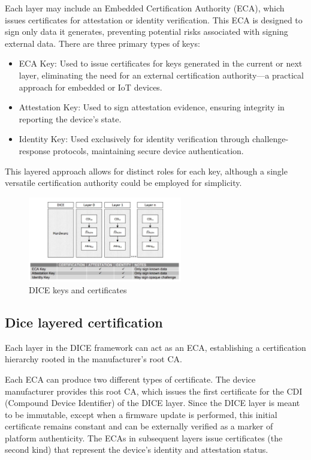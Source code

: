 Each layer may include an Embedded Certification Authority (ECA),
which issues certificates for attestation or identity verification.
This ECA is designed to sign only data it generates, preventing
potential risks associated with signing external data. There are three
primary types of keys:

\begin{itemize}
  \item ECA Key: Used to issue certificates for keys generated in the
    current or next layer, eliminating the need for an external
    certification authority—a practical approach for embedded or IoT
    devices.
  \item Attestation Key: Used to sign attestation evidence, ensuring
    integrity in reporting the device's state.
  \item Identity Key: Used exclusively for identity verification
    through challenge-response protocols, maintaining secure device
    authentication.
\end{itemize}

This layered approach allows for distinct roles for each key, although
a single versatile certification authority could be employed for
simplicity.

\begin{figure}[H]
  \centering
  \includegraphics[width=0.6\textwidth]{img/dice keycert.png}
  \caption{DICE keys and certificates}
\end{figure}

\subsection{Dice layered certification}
\begin{boxH}
  Each layer in the DICE framework can act as an ECA, establishing a
  certification hierarchy rooted in the manufacturer’s root CA. 
\end{boxH}
Each ECA can produce two different types of certificate.
The device manufacturer provides this root CA, which issues the first
certificate for the CDI (Compound Device Identifier) of the DICE
layer. Since the DICE layer is meant to be immutable, except when a
firmware update is performed, this initial certificate remains
constant and can be externally verified as a marker of platform
authenticity.
The ECAs in subsequent layers issue certificates (the second kind)
that represent the device's identity and attestation status. 

